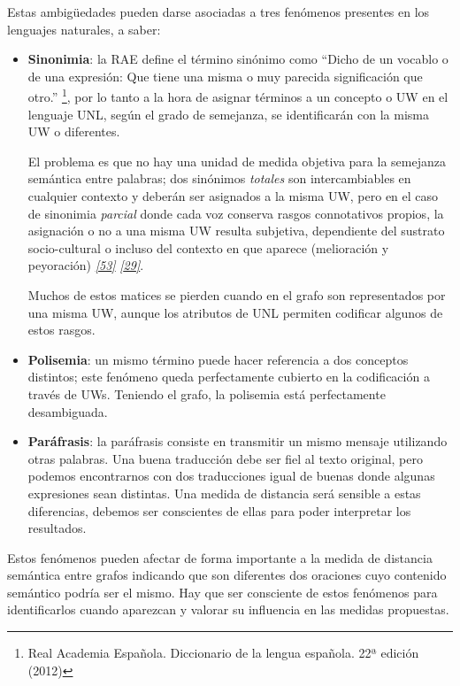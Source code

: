 \documentclass[a4paper,12pt,spanish]{book}
\begin{document}
Estas ambigüedades pueden darse asociadas a tres fenómenos presentes en los
lenguajes naturales, a saber:
\begin{itemize}
\item {} 
\textbf{Sinonimia}: la RAE define el término sinónimo como ``Dicho de un vocablo o de una
expresión: Que tiene una misma o muy parecida significación que otro.'' \footnote{
Real Academia Española. Diccionario de la lengua española. 22ª edición (2012)
}, por lo
tanto a la hora de asignar términos a un concepto o UW en el lenguaje UNL, según
el grado de semejanza, se identificarán con la misma UW o diferentes.

El problema es que no hay una unidad de medida objetiva para la semejanza
semántica entre palabras; dos sinónimos \emph{totales} son intercambiables en cualquier
contexto y deberán ser asignados a la misma UW, pero en el caso de sinonimia \emph{parcial}
donde cada voz conserva rasgos connotativos propios, la asignación o no a una misma UW
resulta subjetiva, dependiente del sustrato socio-cultural o incluso del
contexto en que aparece (melioración y peyoración) \label{1.state-of-the-art/iii.distancia-semantica:id6}{\hyperref[zreferences:martinellgifre1994]{\emph{{[}53{]}}}}
\label{1.state-of-the-art/iii.distancia-semantica:id7}{\hyperref[zreferences:gelabert1994]{\emph{{[}29{]}}}}.

Muchos de estos matices se pierden cuando en el grafo son representados por una misma UW,
aunque los atributos de UNL permiten codificar algunos de estos rasgos.

\item {} 
\textbf{Polisemia}: un mismo término puede hacer referencia a dos conceptos distintos; este
fenómeno queda perfectamente cubierto en la codificación a través de UWs. Teniendo el
grafo, la polisemia está perfectamente desambiguada.

\item {} 
\textbf{Paráfrasis}: la paráfrasis consiste en transmitir un mismo mensaje utilizando otras
palabras. Una buena traducción debe ser fiel al texto original, pero podemos encontrarnos
con dos traducciones igual de buenas donde algunas expresiones sean distintas. Una medida
de distancia será sensible a estas diferencias, debemos ser conscientes de ellas para poder
interpretar los resultados.

\end{itemize}

Estos fenómenos pueden afectar de forma importante a la medida de distancia semántica entre
grafos indicando que son diferentes dos oraciones cuyo contenido semántico podría ser el
mismo. Hay que ser consciente de estos fenómenos para identificarlos cuando aparezcan y
valorar su influencia en las medidas propuestas.
\end{document}
